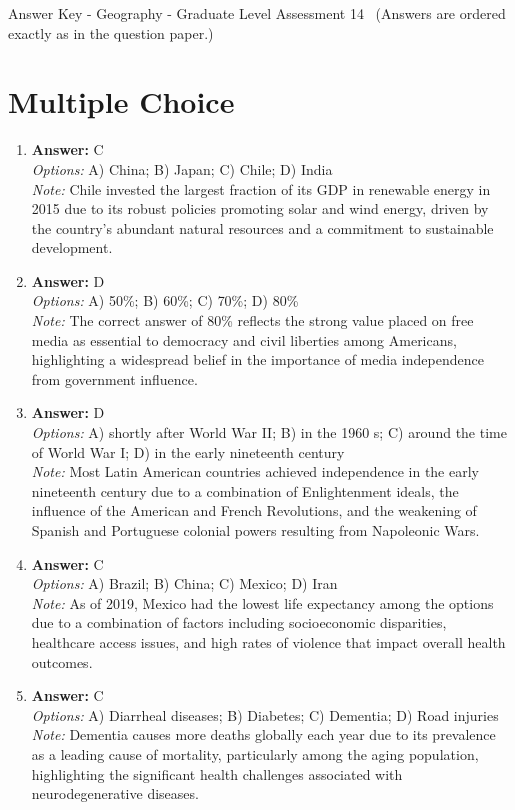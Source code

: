 \documentclass[12pt]{article}
\begin{document}
\begin{center}
Answer Key - Geography - Graduate Level Assessment 14 \
\small (Answers are ordered exactly as in the question paper.)
\end{center}

\section*{Multiple Choice}
\begin{enumerate}[label=\arabic*.]
\item \textbf{Answer:} C
\\ \textit{Options:} A) China; B) Japan; C) Chile; D) India
\\ \textit{Note:} Chile invested the largest fraction of its GDP in renewable energy in 2015 due to its robust policies promoting solar and wind energy, driven by the country's abundant natural resources and a commitment to sustainable development.
\item \textbf{Answer:} D
\\ \textit{Options:} A) 50\%; B) 60\%; C) 70\%; D) 80\%
\\ \textit{Note:} The correct answer of 80\% reflects the strong value placed on free media as essential to democracy and civil liberties among Americans, highlighting a widespread belief in the importance of media independence from government influence.
\item \textbf{Answer:} D
\\ \textit{Options:} A) shortly after World War II; B) in the 1960 s; C) around the time of World War I; D) in the early nineteenth century
\\ \textit{Note:} Most Latin American countries achieved independence in the early nineteenth century due to a combination of Enlightenment ideals, the influence of the American and French Revolutions, and the weakening of Spanish and Portuguese colonial powers resulting from Napoleonic Wars.
\item \textbf{Answer:} C
\\ \textit{Options:} A) Brazil; B) China; C) Mexico; D) Iran
\\ \textit{Note:} As of 2019, Mexico had the lowest life expectancy among the options due to a combination of factors including socioeconomic disparities, healthcare access issues, and high rates of violence that impact overall health outcomes.
\item \textbf{Answer:} C
\\ \textit{Options:} A) Diarrheal diseases; B) Diabetes; C) Dementia; D) Road injuries
\\ \textit{Note:} Dementia causes more deaths globally each year due to its prevalence as a leading cause of mortality, particularly among the aging population, highlighting the significant health challenges associated with neurodegenerative diseases.
\end{enumerate}
\end{document}
